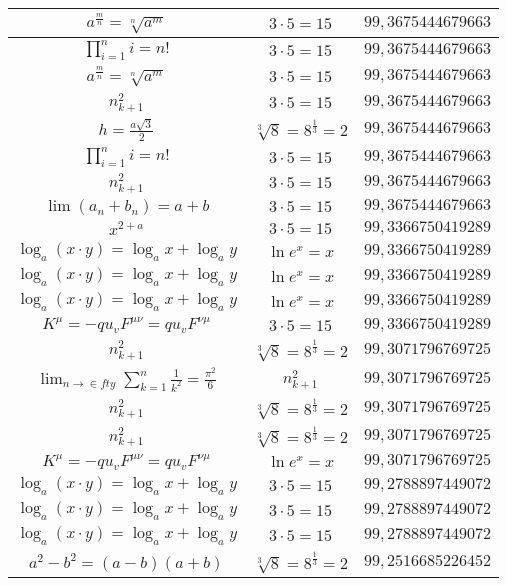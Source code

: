 \documentclass{article}
\begin{document}
\begin{flushleft}
\begin{longtable}{|c|c|c|}
$a^{\frac{m}{n}}=\sqrt[n]{a^{m}}$ & $3\cdot 5=15$ & $99,3675444679663$ \\ \hline 
$\prod_{i=1}^ni=n!$ & $3\cdot 5=15$ & $99,3675444679663$ \\ \hline 
$a^{\frac{m}{n}}=\sqrt[n]{a^{m}}$ & $3\cdot 5=15$ & $99,3675444679663$ \\ \hline 
$n_{k+1}^2$ & $3\cdot 5=15$ & $99,3675444679663$ \\ \hline 
$h=\frac{a\sqrt{3}}{2}$ & $\sqrt[3]{8}=8^{\frac{1}{3}}=2$ & $99,3675444679663$ \\ \hline 
$\prod_{i=1}^ni=n!$ & $3\cdot 5=15$ & $99,3675444679663$ \\ \hline 
$n_{k+1}^2$ & $3\cdot 5=15$ & $99,3675444679663$ \\ \hline 
$\lim\left(a_n+b_n\right)=a+b$ & $3\cdot 5=15$ & $99,3675444679663$ \\ \hline 
$x^{2+a}$ & $3\cdot 5=15$ & $99,3366750419289$ \\ \hline 
$\log_{a}(x\cdot y)=\log_{a}x+\log_{a}y$ & $\ln e^x=x$ & $99,3366750419289$ \\ \hline 
$\log_{a}(x\cdot y)=\log_{a}x+\log_{a}y$ & $\ln e^x=x$ & $99,3366750419289$ \\ \hline 
$\log_{a}(x\cdot y)=\log_{a}x+\log_{a}y$ & $\ln e^x=x$ & $99,3366750419289$ \\ \hline 
$K^\mu=-qu_vF^{\mu\nu}=qu_vF^{\nu\mu}$ & $3\cdot 5=15$ & $99,3366750419289$ \\ \hline 
$n_{k+1}^2$ & $\sqrt[3]{8}=8^{\frac{1}{3}}=2$ & $99,3071796769725$ \\ \hline 
$\lim_{n\to\in fty}\sum_{k=1}^n\frac{1}{k^2}=\frac{\pi^2}{6}$ & $n_{k+1}^2$ & $99,3071796769725$ \\ \hline 
$n_{k+1}^2$ & $\sqrt[3]{8}=8^{\frac{1}{3}}=2$ & $99,3071796769725$ \\ \hline 
$n_{k+1}^2$ & $\sqrt[3]{8}=8^{\frac{1}{3}}=2$ & $99,3071796769725$ \\ \hline 
$K^\mu=-qu_vF^{\mu\nu}=qu_vF^{\nu\mu}$ & $\ln e^x=x$ & $99,3071796769725$ \\ \hline 
$\log_{a}(x\cdot y)=\log_{a}x+\log_{a}y$ & $3\cdot 5=15$ & $99,2788897449072$ \\ \hline 
$\log_{a}(x\cdot y)=\log_{a}x+\log_{a}y$ & $3\cdot 5=15$ & $99,2788897449072$ \\ \hline 
$\log_{a}(x\cdot y)=\log_{a}x+\log_{a}y$ & $3\cdot 5=15$ & $99,2788897449072$ \\ \hline 
$a^2-b^2=(a-b)(a+b)$ & $\sqrt[3]{8}=8^{\frac{1}{3}}=2$ & $99,2516685226452$ \\ \hline 

\end{longtable}
\end{flushleft}
\end{document}
